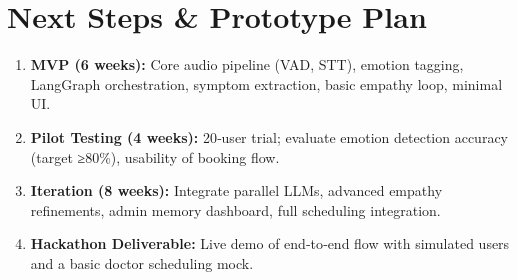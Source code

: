 \section{Next Steps \& Prototype Plan}
\begin{enumerate}[left=0pt]
  \item \textbf{MVP (6 weeks):} Core audio pipeline (VAD, STT), emotion tagging, LangGraph orchestration, symptom extraction, basic empathy loop, minimal UI.
  \item \textbf{Pilot Testing (4 weeks):} 20‐user trial; evaluate emotion detection accuracy (target ≥80\%), usability of booking flow.
  \item \textbf{Iteration (8 weeks):} Integrate parallel LLMs, advanced empathy refinements, admin memory dashboard, full scheduling integration.
  \item \textbf{Hackathon Deliverable:} Live demo of end‐to‐end flow with simulated users and a basic doctor scheduling mock.
\end{enumerate} 